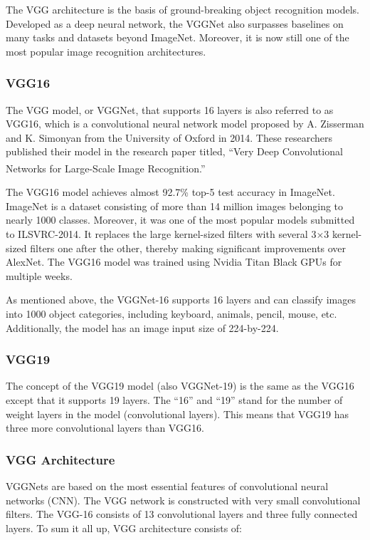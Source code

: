 The VGG architecture is the basis of ground-breaking object recognition models. Developed as a deep neural network, the VGGNet also surpasses baselines on many tasks and datasets beyond ImageNet. Moreover, it is now still one of the most popular image recognition architectures. 

\subsubsection{VGG16}
The VGG model, or VGGNet, that supports 16 layers is also referred to as VGG16, which is a convolutional neural network model proposed by A. Zisserman and K. Simonyan from the University of Oxford in 2014. These researchers published their model in the research paper titled, “Very Deep Convolutional Networks for Large-Scale Image Recognition.” \textsuperscript{\cite{simonyan2014very}} 

The VGG16 model achieves almost 92.7\% top-5 test accuracy in ImageNet. ImageNet is a dataset consisting of more than 14 million images belonging to nearly 1000 classes. Moreover, it was one of the most popular models submitted to ILSVRC-2014. It replaces the large kernel-sized filters with several 3×3 kernel-sized filters one after the other, thereby making significant improvements over AlexNet. The VGG16 model was trained using Nvidia Titan Black GPUs for multiple weeks.

As mentioned above, the VGGNet-16 supports 16 layers and can classify images into 1000 object categories, including keyboard, animals, pencil, mouse, etc. Additionally, the model has an image input size of 224-by-224.

\subsubsection{VGG19}
The concept of the VGG19 model (also VGGNet-19) is the same as the VGG16 except that it supports 19 layers. The “16” and “19” stand for the number of weight layers in the model (convolutional layers). This means that VGG19 has three more convolutional layers than VGG16. 

\subsubsection{VGG Architecture}
VGGNets are based on the most essential features of convolutional neural networks (CNN).
The VGG network is constructed with very small convolutional filters. The VGG-16 consists of 13 convolutional layers and three fully connected layers.
To sum it all up, VGG architecture consists of:

